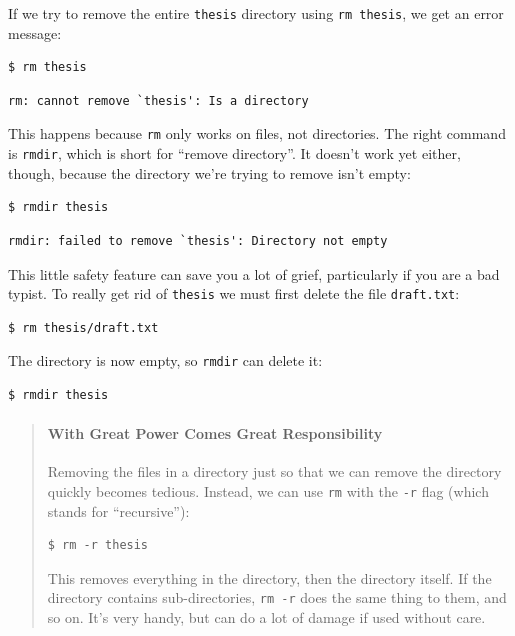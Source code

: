 \documentclass[]{book}
\begin{document}
If we try to remove the entire \texttt{thesis} directory using
\texttt{rm thesis}, we get an error message:

\begin{verbatim}
$ rm thesis
\end{verbatim}

\begin{verbatim}
rm: cannot remove `thesis': Is a directory
\end{verbatim}

This happens because \texttt{rm} only works on files, not directories.
The right command is \texttt{rmdir}, which is short for ``remove
directory''. It doesn't work yet either, though, because the directory
we're trying to remove isn't empty:

\begin{verbatim}
$ rmdir thesis
\end{verbatim}

\begin{verbatim}
rmdir: failed to remove `thesis': Directory not empty
\end{verbatim}

This little safety feature can save you a lot of grief, particularly if
you are a bad typist. To really get rid of \texttt{thesis} we must first
delete the file \texttt{draft.txt}:

\begin{verbatim}
$ rm thesis/draft.txt
\end{verbatim}

The directory is now empty, so \texttt{rmdir} can delete it:

\begin{verbatim}
$ rmdir thesis
\end{verbatim}

\begin{quote}
\mbox{}\paragraph{With Great Power Comes Great Responsibility}

Removing the files in a directory just so that we can remove the
directory quickly becomes tedious. Instead, we can use \texttt{rm} with
the \texttt{-r} flag (which stands for ``recursive''):

\begin{verbatim}
$ rm -r thesis
\end{verbatim}

This removes everything in the directory, then the directory itself. If
the directory contains sub-directories, \texttt{rm -r} does the same
thing to them, and so on. It's very handy, but can do a lot of damage if
used without care.
\end{quote}
\end{document}
